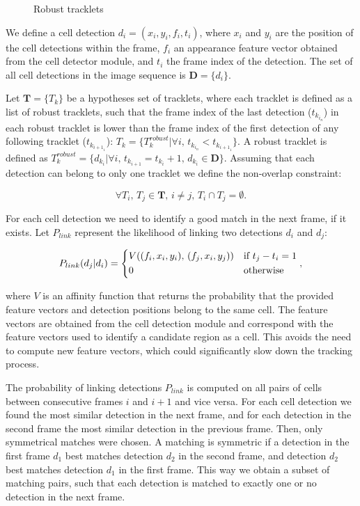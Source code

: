 		\begin{figure}[h]
			\centering
			\caption{Robust tracklets}
			\label{fig:robusttracklets}
		\end{figure}
		
		We define a cell detection $ d_i = (x_i, y_i, f_i, t_i) $, where $x_i$ and $y_i$ are the position of the cell detections within the frame, $ f_i $ an appearance feature vector obtained from the cell detector module, and $t_i$ the frame index of the detection. The set of all cell detections in the image sequence is $\textbf{D} = \{d_i\}$. 
		
		Let $ \textbf{T} = \{ T_k \} $ be a hypotheses set of tracklets, where each tracklet is defined as a list of robust tracklets, such that the frame index of the last detection ($ t_{k_{i_n}} $) in each robust tracklet is lower than the frame index of the first detection of any following tracklet ($  t_{k_{{i+1}_1}} $):	$T_k = \{T_k^{robust} | \forall i\text{, }  t_{k_{i_n}} < t_{k_{{i+1}_1}} \}$. A robust tracklet is defined as $ T_k^{robust} = \{ d_{k_i} | \forall i\text{, } t_{k_{i+1}} = t_{k_i}+1\text{, } d_{k_i} \in \textbf{D} \} $. Assuming that each detection can belong to only one tracklet we define the non-overlap constraint:
		
		\[
			\forall T_i \text{, } T_j \in \textbf{T} \text{, } i \neq j \text{, }  T_i \cap T_j = \emptyset \text{.}
		\]
		
		For each cell detection we need to identify a good match in the next frame, if it exists. Let $P_{link}$ represent the likelihood of linking two detections $d_i$ and $d_j$:
		
		\[
			P_{link}(d_j|d_i) = 
			\begin{dcases}
			   V((f_i, x_i, y_i)\text{, } (f_j, x_i, y_j)) & \text{if } t_j - t_i = 1 \\
			   0       & \text{otherwise}
			\end{dcases},
		\]
		
		\noindent where $V$ is an affinity function that returns the probability that the provided feature vectors and detection positions belong to the same cell. The feature vectors are obtained from the cell detection module and correspond with the feature vectors used to identify a candidate region as a cell. This avoids the need to compute new feature vectors, which could significantly slow down the tracking process.

		The probability of linking detections $P_{link}$ is computed on all pairs of cells between consecutive frames $i$ and $i+1$ and vice versa. For each cell detection we found the most similar detection in the next frame, and for each detection in the second frame the most similar detection in the previous frame. Then, only symmetrical matches were chosen. A matching is symmetric if a detection in the first frame $d_1$ best matches detection $d_2$ in the second frame, and detection $d_2$ best matches detection $ d_1 $ in the first frame. This way we obtain a subset of matching pairs, such that each detection is matched to exactly one or no detection in the next frame.
		
